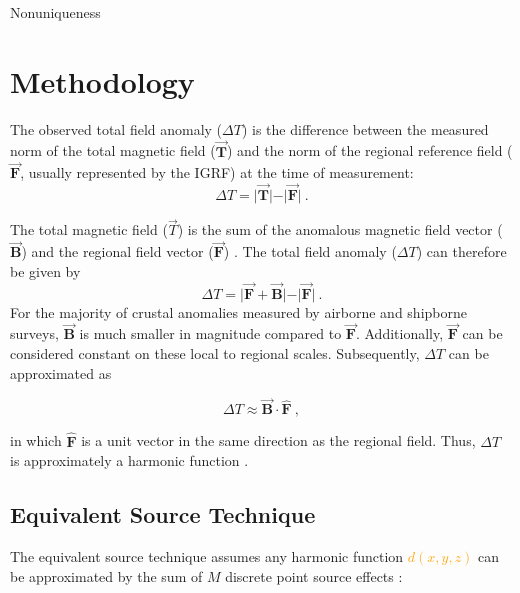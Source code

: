 Nonuniqueness

\clearpage


\section{Methodology}

The observed total field anomaly ($\Delta T$) is the difference between the measured norm of the total magnetic field ($\vec{\mathbf{T}}$) and the norm of the regional reference field ($\vec{\mathbf{F}}$, usually represented by the IGRF) at the time of measurement:
\begin{equation}
    \Delta T = \vert \vec{\mathbf{T}} \vert - \vert \vec{\mathbf{F}} \vert
    \ .
\end{equation}

\noindent
The total magnetic field ($\vec{T}$) is the sum of the anomalous magnetic field vector ($\vec{\mathbf{B}}$) and the regional field vector ($\vec{\mathbf{F}}$) \citep{Blakley1995, Langel1998, OliveiraJr2015}. The total field anomaly ($\Delta T$) can therefore be given by
\begin{equation}
    \Delta T = \vert \vec{\mathbf{F}} + \vec{\mathbf{B}} \vert - \vert \vec{\mathbf{F}} \vert
    \ .
\end{equation}
\noindent
For the majority of crustal anomalies measured by airborne and shipborne surveys, $\vec{\mathbf{B}}$ is much smaller in magnitude compared to $\vec{\mathbf{F}}$. Additionally, $\vec{\mathbf{F}}$ can be considered constant on these local to regional scales. Subsequently, $\Delta T$ can be approximated as

\begin{equation}
\label{eq:tfa_dot_product}
    \Delta T\approx  \vec{\mathbf{B}} \cdot \hat{\mathbf{F}}
    \ ,
\end{equation}

\noindent
in which $\hat{\mathbf{F}}$ is a unit vector in the same direction as the regional field. Thus, $\Delta T$ is approximately a harmonic function \citep{Blakley1995,OliveiraJr2015}.


\subsection{Equivalent Source Technique}

The equivalent source technique assumes any harmonic function \textcolor{orange}{$d(x, y, z)$} can be approximated by the sum of $M$ discrete point source effects \citep{Dampney1969, Cordell1992}:

